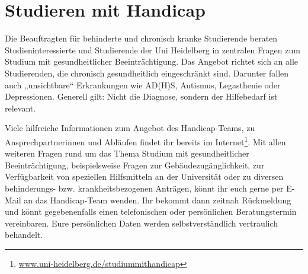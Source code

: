 \section{Studieren mit Handicap}
Die Beauftragten für behinderte und chronisch kranke Studierende beraten Studieninteressierte und Studierende der Uni Heidelberg in zentralen Fragen zum Studium mit gesundheitlicher Beeinträchtigung.
Das Angebot richtet sich an alle Studierenden, die chronisch gesundheitlich eingeschränkt sind. Darunter fallen auch „unsichtbare“ Erkrankungen wie AD(H)S, Autismus, Legasthenie oder Depressionen. Generell gilt: Nicht die Diagnose, sondern der Hilfebedarf ist relevant.

Viele hilfreiche Informationen zum Angebot des Handicap-Teams, zu Ansprechpartnerinnen und Abläufen findet ihr bereits im Internet\footnote{\url{www.uni-heidelberg.de/studiummithandicap}}. Mit allen weiteren Fragen rund um das Thema Studium mit gesundheitlicher Beeinträchtigung, beispielsweise Fragen zur Gebäudezugänglichkeit,  zur Verfügbarkeit von speziellen Hilfsmitteln an der Universität oder zu diversen behinderungs- bzw. krankheitsbezogenen Anträgen, könnt ihr euch gerne per E-Mail an das Handicap-Team wenden. Ihr bekommt dann zeitnah Rückmeldung und könnt gegebenenfalls einen telefonischen oder persönlichen Beratungstermin vereinbaren.
Eure persönlichen Daten werden selbstverständlich vertraulich behandelt.